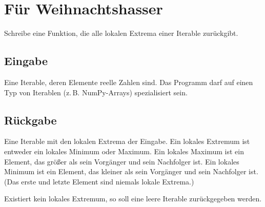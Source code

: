 \documentclass[a4paper, 17 pt]{extarticle}
\begin{document}
\section{Für Weihnachtshasser}

Schreibe eine Funktion, die alle lokalen Extrema einer Iterable zurückgibt.

\subsection{Eingabe}

Eine Iterable, deren Elemente reelle Zahlen sind. Das Programm darf auf einen Typ von Iterablen (z.\,B. NumPy-Arrays) spezialisiert sein.

\subsection{Rückgabe}

Eine Iterable mit den lokalen Extrema der Eingabe.
Ein lokales Extremum ist entweder ein lokales Minimum oder Maximum.
Ein lokales Maximum ist ein Element, das größer als sein Vorgänger und sein Nachfolger ist.
Ein lokales Minimum ist ein Element, das kleiner als sein Vorgänger und sein Nachfolger ist.
(Das erste und letzte Element sind niemals lokale Extrema.)

Existiert kein lokales Extremum, so soll eine leere Iterable zurückgegeben werden.
\end{document}
